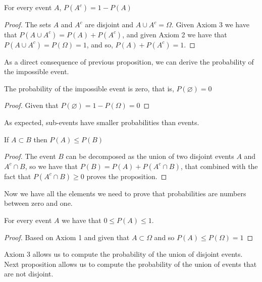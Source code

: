 \begin{proposition}
For every event $A$, $P \left( A^{c} \right) = 1 - P \left( A \right)$
\end{proposition}
\begin{proof}
The sets $A$ and $A^c$ are disjoint and $A \cup A^c = \Omega$. Given Axiom 3 we have that $P \left( A \cup A^c \right) = P \left( A \right) + P \left( A^c \right)$, and given Axiom 2 we have that $P \left( A \cup A^c \right) = P(\Omega) = 1$, and so, $P \left( A \right) + P \left( A^c \right) = 1$.
\end{proof}

As a direct consequence of previous proposition, we can derive the probability of the impossible event.

\begin{proposition}
The probability of the impossible event is zero, that is, $P \left( \varnothing \right) = 0$
\end{proposition}
\begin{proof}
Given that $P \left( \varnothing \right) = 1 - P \left( \Omega \right) = 0$
\end{proof}

As expected, sub-events have smaller probabilities than events.

\begin{proposition}
If $A\subset B$ then $P \left( A \right) \leq P \left( B \right)$
\end{proposition}
\begin{proof}
The event $B$ can be decomposed as the union of two disjoint events $A$ and $A^c \cap B$, so we have that $P \left( B \right) = P \left( A \right) + P \left( A^c \cap B \right)$, that combined with the fact that  $P \left( A^c \cap B \right) \geq 0$ proves the proposition.
\end{proof}

Now we have all the elements we need to prove that probabilities are numbers between zero and one.

\begin{proposition}
For every event $A$ we have that $0 \leq P \left( A \right) \leq 1$.
\end{proposition}
\begin{proof}
Based on Axiom 1 and given that $A \subset \Omega$ and so $P \left( A \right) \leq P \left( \Omega \right) = 1$
\end{proof}

Axiom 3 allows us to compute the probability of the union of disjoint events. Next proposition allows us to compute the probability of the union of events that are not disjoint.

